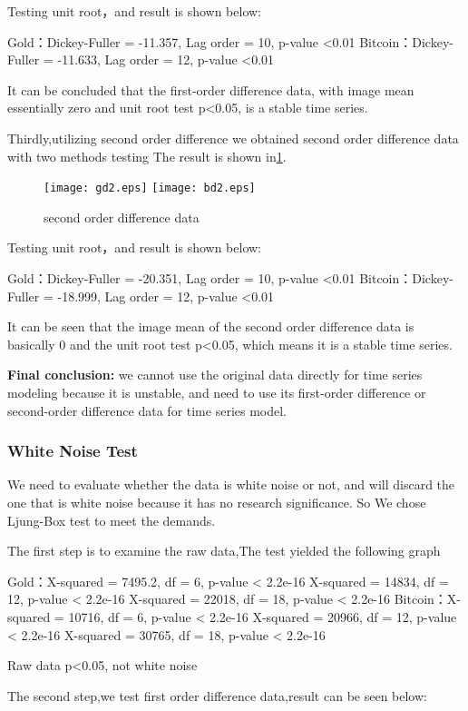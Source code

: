 \documentclass{mcmthesis}
\begin{document}
Testing unit root，and result is shown below:

Gold：Dickey-Fuller = -11.357, Lag order = 10, p-value <0.01
Bitcoin：Dickey-Fuller = -11.633, Lag order = 12, p-value <0.01

It can be concluded that the first-order difference data, with image mean essentially zero and unit root test p<0.05, is a stable time series.


Thirdly,utilizing second order difference we obtained second order difference data with two methods testing
The result is shown in\ref{fig5}.
\begin{figure}[!h]
  \centering 
  \texttt{[image: gd2.eps]}
  \texttt{[image: bd2.eps]}
  \caption{second order difference data} \label{fig5}
\end{figure}

Testing unit root，and result is shown below:

Gold：Dickey-Fuller = -20.351, Lag order = 10, p-value <0.01
Bitcoin：Dickey-Fuller = -18.999, Lag order = 12, p-value <0.01

It can be seen that the image mean of the second order difference data is basically 0 and the unit root test p<0.05, which means it is a stable time series.

\textbf{Final conclusion:} we cannot use the original data directly for time series modeling because it is unstable, and need to use its first-order difference or second-order difference data for time series model.


\subsubsection{White Noise Test}
We need to evaluate whether the data is white noise or not, 
and will discard the one that is white noise because it has no research significance.
So We chose Ljung-Box test to meet the demands.

The first step is to examine the raw data,The test yielded the following graph

Gold：X-squared = 7495.2, df = 6, p-value < 2.2e-16
X-squared = 14834, df = 12, p-value < 2.2e-16
X-squared = 22018, df = 18, p-value < 2.2e-16
Bitcoin：X-squared = 10716, df = 6, p-value < 2.2e-16
X-squared = 20966, df = 12, p-value < 2.2e-16
X-squared = 30765, df = 18, p-value < 2.2e-16

Raw data p<0.05, not white noise

The second step,we test first order difference data,result can be seen below:
\end{document}
